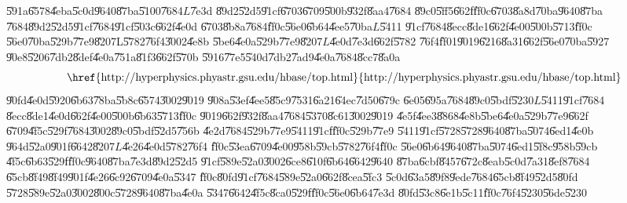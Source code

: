 \U{591a}\U{6578}\U{4eba}\U{5c0d}\U{9640}\U{87ba}\U{5100}\U{7684}$L$\U{7e3d}%
\U{89d2}\U{52d5}\U{91cf}\U{6703}\U{6709}\U{500b}\U{932f}\U{8aa4}\U{7684}%
\U{89c0}\U{5ff5}\U{662f}\U{ff0c}\U{6703}\U{8a8d}\U{70ba}\U{9640}\U{87ba}%
\U{7684}\U{89d2}\U{52d5}\U{91cf}\U{7684}\U{91cf}\U{503c}\U{662f}\U{4e0d}%
\U{6703}\U{8b8a}\U{7684}\U{ff0c}\U{56e0}\U{6b64}\U{4ee5}\U{70ba}$L$\U{5411}%
\U{91cf}\U{7684}\U{8ecc}\U{8de1}\U{662f}\U{4e00}\U{500b}\U{5713}\U{ff0c}%
\U{56e0}\U{70ba}\U{529b}\U{77e9}\U{8207}L\U{5782}\U{76f4}\U{3002}\U{4e8b}%
\U{5be6}\U{4e0a}\U{529b}\U{77e9}\U{8207}$L$\U{4e0d}\U{7e3d}\U{662f}\U{5782}%
\U{76f4}\U{ff01}\U{9019}\U{6216}\U{8a31}\U{662f}\U{56e0}\U{70ba}\U{5927}%
\U{90e8}\U{5206}\U{7db2}\U{8def}\U{4e0a}\U{751a}\U{81f3}\U{662f}\U{570b}%
\U{5916}\U{77e5}\U{540d}\U{7db2}\U{7ad9}\U{4e0a}\U{7684}\U{8cc7}\U{8a0a}%
\begin{equation*}
\text{\href{http://hyperphysics.phyastr.gsu.edu/hbase/top.html}{%
http://hyperphysics.phyastr.gsu.edu/hbase/top.html}}
\end{equation*}%
\U{90fd}\U{4e0d}\U{5920}\U{6b63}\U{78ba}\U{5b8c}\U{6574}\U{3002}\U{9019}%
\U{908a}\U{53ef}\U{4ee5}\U{85c9}\U{7531}\U{6a21}\U{64ec}\U{7d50}\U{679c}%
\U{6e05}\U{695a}\U{7684}\U{89c0}\U{5bdf}\U{5230}$L$\U{5411}\U{91cf}\U{7684}%
\U{8ecc}\U{8de1}\U{4e0d}\U{662f}\U{4e00}\U{500b}\U{6b63}\U{5713}\U{ff0c}%
\U{9019}\U{662f}\U{932f}\U{8aa4}\U{7684}\U{5370}\U{8c61}\U{3002}\U{9019}%
\U{4e5f}\U{4ee3}\U{8868}\U{4e8b}\U{5be6}\U{4e0a}\U{529b}\U{77e9}\U{662f}%
\U{6709}\U{4f5c}\U{529f}\U{7684}\U{3002}\U{89c0}\U{5bdf}\U{52d5}\U{756b}%
\U{4e2d}\U{7684}\U{529b}\U{77e9}\U{5411}\U{91cf}\U{ff0c}\U{529b}\U{77e9}%
\U{5411}\U{91cf}\U{5728}\U{5728}\U{9640}\U{87ba}\U{5074}\U{6ed1}\U{4e0b}%
\U{964d}\U{52a0}\U{901f}\U{6642}\U{8207}$L$\U{4e26}\U{4e0d}\U{5782}\U{76f4}%
\U{ff0c}\U{53ea}\U{6709}\U{4e00}\U{958b}\U{59cb}\U{5782}\U{76f4}\U{ff0c}%
\U{56e0}\U{6b64}\U{9640}\U{87ba}\U{5074}\U{6ed1}\U{5f8c}\U{958b}\U{59cb}%
\U{4f5c}\U{6b63}\U{529f}\U{ff0c}\U{9640}\U{87ba}\U{7e3d}\U{89d2}\U{52d5}%
\U{91cf}\U{589e}\U{52a0}\U{3002}\U{6ce8}\U{610f}\U{6b64}\U{6642}\U{9640}%
\U{87ba}\U{6cbf}\U{8457}\U{672c}\U{8eab}\U{5c0d}\U{7a31}\U{8ef8}\U{7684}%
\U{65cb}\U{8f49}\U{8f49}\U{901f}\U{4e26}\U{6c92}\U{6709}\U{4e0a}\U{5347}%
\U{ff0c}\U{80fd}\U{91cf}\U{7684}\U{589e}\U{52a0}\U{662f}\U{8cea}\U{5fc3}%
\U{5c0d}\U{63a5}\U{89f8}\U{9ede}\U{7684}\U{65cb}\U{8f49}\U{52d5}\U{80fd}%
\U{5728}\U{589e}\U{52a0}\U{3002}\U{800c}\U{5728}\U{9640}\U{87ba}\U{4e0a}%
\U{5347}\U{6642}\U{4f5c}\U{8ca0}\U{529f}\U{ff0c}\U{56e0}\U{6b64}\U{7e3d}%
\U{80fd}\U{53c8}\U{6e1b}\U{5c11}\U{ff0c}\U{76f4}\U{5230}\U{56de}\U{5230}%

